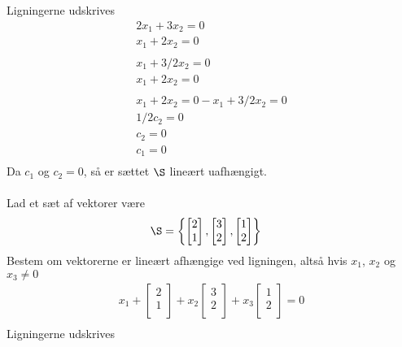 \begin{eks}
Ligningerne udskrives
\noindent
\begin{align*}
2x_1+3x_2=0\\
x_1+2x_2=0\\
\\
x_1+3/2x_2=0\\
x_1+2x_2=0\\
\\
x_1+2x_2=0 - x_1+3/2x_2=0\\
1/2c_2=0\\
c_2=0\\
c_1=0\\
\end{align*}
Da $c_1$ og $c_2 = 0$, så er sættet $\S$ lineært uafhængigt.
\\
\\
\noindent
Lad et sæt af vektorer være 
\begin{align*}
\S &= \left\{
\begin{bmatrix}
           2 \\
           1 \\
\end{bmatrix}
,
\begin{bmatrix}
           3 \\
           2 \\
\end{bmatrix}
,
\begin{bmatrix}
           1 \\
           2 \\
\end{bmatrix}
\right\}
\end{align*}
\noindent
Bestem om vektorerne er lineært afhængige ved ligningen, altså hvis $x_1$, $x_2$ og $x_3 \neq 0$
\begin{align*}
x_1+
\begin{bmatrix}
           2 \\
           1 \\
\end{bmatrix}
+ x_2
\begin{bmatrix}
           3 \\
           2 \\
\end{bmatrix}
+ x_3
\begin{bmatrix}
           1 \\
           2 \\
\end{bmatrix}
=0 \\
\end{align*}
Ligningerne udskrives 


\end{eks}
